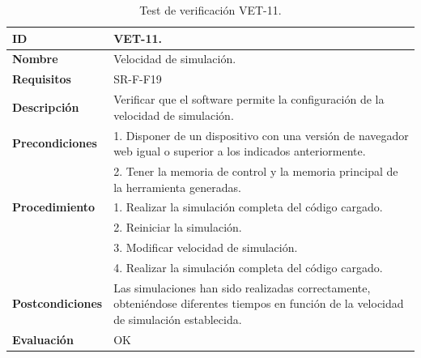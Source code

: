 \begin{center}
\begin{table}[htbp]
\centering
\caption{Test de verificación VET-11.}
\begin{tabular}{@{}p{2.5cm} p{13cm}@{}} 
\toprule
\textbf{ID} 					& VET-11. \\
\midrule
\textbf{Nombre} 				& Velocidad de simulación. \\
\midrule
\textbf{Requisitos} 		& SR-F-F19\\
\midrule
\textbf{Descripción} 		& Verificar que el \gls{software} permite la configuración de la velocidad de simulación. \\
\midrule
\textbf{Precondiciones}		& 1. Disponer de un dispositivo con una versión de navegador web igual o superior a los indicados anteriormente. \\
											& 2. Tener la memoria de control y la memoria principal de la herramienta generadas. \\
\midrule
\textbf{Procedimiento}		& 1. Realizar la simulación completa del código cargado.\\
											& 2. Reiniciar la simulación.\\
											& 3. Modificar velocidad de simulación. \\
											& 4. Realizar la simulación completa del código cargado.\\
\midrule
\textbf{Postcondiciones} 		&  Las simulaciones han sido realizadas correctamente, obteniéndose diferentes tiempos en función de la velocidad de simulación establecida.\\
\midrule
\textbf{Evaluación} 			& OK \\
\bottomrule
\end{tabular}
\label{tab:vet11}
\end{table}
\end{center}

